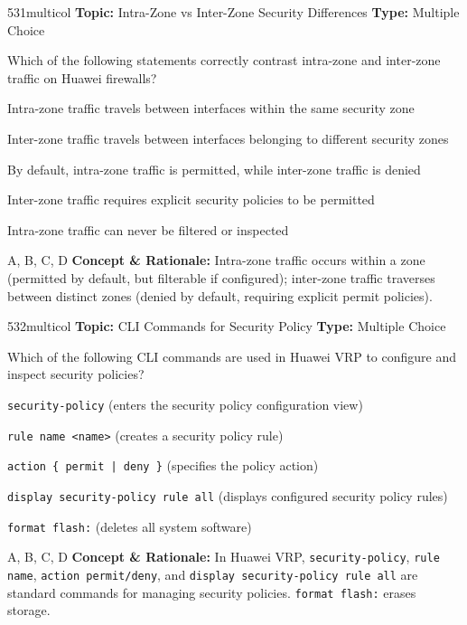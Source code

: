 \begin{qcard}{531}{multicol}
\textcolor{darkslate!75}{\small\textbf{Topic:} Intra-Zone vs Inter-Zone Security Differences \hfill \textbf{Type:} Multiple Choice}\vspace{0.4em}\par
Which of the following statements correctly contrast intra-zone and inter-zone traffic on Huawei firewalls?
\begin{qoptions}
\item Intra-zone traffic travels between interfaces within the same security zone
\item Inter-zone traffic travels between interfaces belonging to different security zones
\item By default, intra-zone traffic is permitted, while inter-zone traffic is denied
\item Inter-zone traffic requires explicit security policies to be permitted
\item Intra-zone traffic can never be filtered or inspected
\end{qoptions}
\end{qcard}
\nopagebreak
\begin{explainbox}{A, B, C, D}
\textbf{Concept \& Rationale:} Intra-zone traffic occurs within a zone (permitted by default, but filterable if configured); inter-zone traffic traverses between distinct zones (denied by default, requiring explicit permit policies).
\end{explainbox}

\begin{qcard}{532}{multicol}
\textcolor{darkslate!75}{\small\textbf{Topic:} CLI Commands for Security Policy \hfill \textbf{Type:} Multiple Choice}\vspace{0.4em}\par
Which of the following CLI commands are used in Huawei VRP to configure and inspect security policies?
\begin{qoptions}
\item \texttt{security-policy} (enters the security policy configuration view)
\item \texttt{rule name \textless{}name\textgreater{}} (creates a security policy rule)
\item \texttt{action \{ permit | deny \}} (specifies the policy action)
\item \texttt{display security-policy rule all} (displays configured security policy rules)
\item \texttt{format flash:} (deletes all system software)
\end{qoptions}
\end{qcard}
\nopagebreak
\begin{explainbox}{A, B, C, D}
\textbf{Concept \& Rationale:} In Huawei VRP, \texttt{security-policy}, \texttt{rule name}, \texttt{action permit/deny}, and \texttt{display security-policy rule all} are standard commands for managing security policies. \texttt{format flash:} erases storage.
\end{explainbox}

